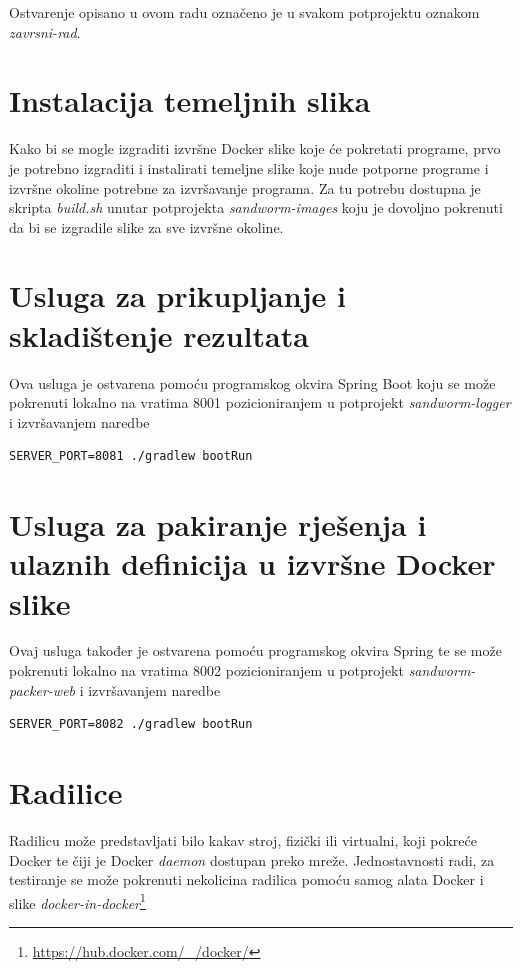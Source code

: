\documentclass[times, utf8, zavrsni]{fer}
\begin{document}
{{{\begin{appendices}
Ostvarenje opisano u ovom radu označeno je u svakom potprojektu oznakom {\textit{zavrsni-rad}}.

\section{Instalacija temeljnih slika}
\label{sec:base-images}

Kako bi se mogle izgraditi izvršne Docker slike koje će pokretati programe, prvo je potrebno izgraditi i instalirati temeljne slike koje nude potporne programe i izvršne okoline potrebne za izvršavanje programa. Za tu potrebu dostupna je skripta {\textit{build.sh}} unutar potprojekta {\textit{sandworm-images}} koju je dovoljno pokrenuti da bi se izgradile slike za sve izvršne okoline.

\section{Usluga za prikupljanje i skladištenje rezultata}

Ova usluga je ostvarena pomoću programskog okvira Spring Boot koju se može pokrenuti lokalno na vratima 8001 pozicioniranjem u potprojekt {\textit{sandworm-logger}} i izvršavanjem naredbe

\begin{lstlisting}
SERVER_PORT=8081 ./gradlew bootRun
\end{lstlisting}

\section{Usluga za pakiranje rješenja i ulaznih definicija u izvršne Docker slike}

Ovaj usluga također je ostvarena pomoću programskog okvira Spring te se može pokrenuti lokalno na vratima 8002 pozicioniranjem u potprojekt {\textit{sandworm-packer-web}} i izvršavanjem naredbe

\begin{lstlisting}
SERVER_PORT=8082 ./gradlew bootRun
\end{lstlisting}

\section{Radilice}

Radilicu može predstavljati bilo kakav stroj, fizički ili virtualni, koji pokreće Docker te čiji je Docker {\textit{daemon}} dostupan preko mreže. Jednostavnosti radi, za testiranje se može pokrenuti nekolicina radilica pomoću samog alata Docker i slike {\textit{docker-in-docker}}{\footnote{\url{https://hub.docker.com/_/docker/}}}


\end{appendices}}}}
\end{document}
